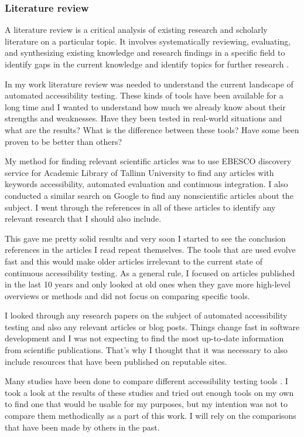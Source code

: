 \documentclass{master_thesis}
\begin{document}
\subsubsection{Literature review}

A literature review is a critical analysis of existing research and scholarly literature on a particular topic. It involves systematically reviewing, evaluating, and synthesizing existing knowledge and research findings in a specific field to identify gaps in the current knowledge and identify topics for further research \citep{Luft2022}.

In my work literature review was needed to understand the current landscape of automated accessibility testing. These kinds of tools have been available for a long time and I wanted to understand how much we already know about their strengths and weaknesses. Have they been tested in real-world situations and what are the results? What is the difference between these tools? Have some been proven to be better than others?

My method for finding relevant scientific articles was to use EBESCO discovery service for Academic Library of Tallinn University to find any articles with keywords accessibility, automated evaluation and continuous integration. I also conducted a similar search on Google to find any nonscientific articles about the subject. I went through the references in all of these articles to identify any relevant research that I should also include.

This gave me pretty solid results and very soon I started to see the conclusion references in the articles I read repeat themselves. The tools that are used evolve fast and this would make older articles irrelevant to the current state of continuous accessibility testing. As a general rule, I focused on articles published in the last 10 years and only looked at old ones when they gave more high-level overviews or methods and did not focus on comparing specific tools.

I looked through any research papers on the subject of automated accessibility testing and also any relevant articles or blog posts. Things change fast in software development and I was not expecting to find the most up-to-date information from scientific publications. That's why I thought that it was necessary to also include resources that have been published on reputable sites.

Many studies have been done to compare different accessibility testing tools \citep{Alsaeedi2020, Ismailova2022, Sane2021, Vigo2013, RybinKoob2022, Duran2017}. I took a look at the results of these studies and tried out enough tools on my own to find one that would be usable for my purposes, but my intention was not to compare them methodically as a part of this work. I will rely on the comparisons that have been made by others in the past.
\end{document}
